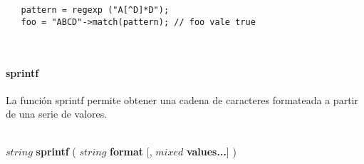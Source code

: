 \begin{lstlisting}   
   pattern = regexp ("A[^D]*D"); 
   foo = "ABCD"->match(pattern); // foo vale true
\end{lstlisting}
\hfill\\ 

\paragraph{sprintf}
La función sprintf permite obtener una cadena de caracteres formateada a partir de una serie de valores. 

\hfill \\ $string$ \textbf{sprintf} ( $string$ \textbf{format} [, $mixed$ \textbf{values...}] )  
